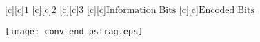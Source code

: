 \documentclass{article}
\begin{document}
\begin{figure}[htb]
  \begin{center}

        [c][c]{$1$}
        [c][c]{$2$}
        [c][c]{$3$}
        [c][c]{$\mathrm{Information\;Bits}$}
        [c][c]{\hspace{10mm}$\mathrm{Encoded\;Bits}$}


    \texttt{[image: conv\_end\_psfrag.eps]}
    \end{center}
\end{figure}
\end{document}
